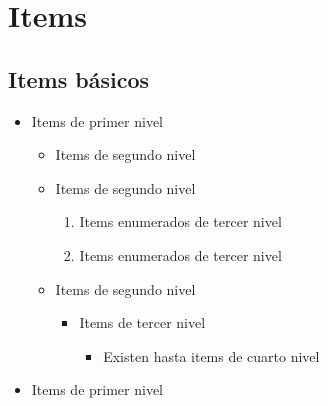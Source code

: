 \documentclass{article}
\begin{document}
\section{Items} 
\subsection{Items básicos}
\begin{itemize}
    \item Items de primer nivel
        \begin{itemize}
            \item Items de segundo nivel 
            \item Items de segundo nivel
            \begin{enumerate}
            \item Items enumerados de tercer nivel
            \item Items enumerados de tercer nivel
            \end{enumerate}
            \item Items de segundo nivel
               \begin{itemize}
                    \item Items de tercer nivel 
                    \begin{itemize}
                        \item Existen hasta items de cuarto nivel
                    \end{itemize}
               \end{itemize}
        \end{itemize}
    \item Items de primer nivel
\end{itemize}
\end{document}
